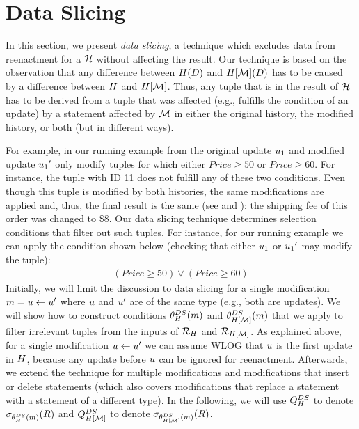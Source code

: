 \section{Data Slicing}
\label{sec:filter}

In this section, we present \textit{data slicing}, a technique which excludes data from reenactment for a \abbrHW $\mathcal{H}$ without affecting the result. Our technique is based on the observation that any difference between $H(D)$ and $H[\mathcal{M}](D)$ has to be caused  by a difference between $H$ and $H[\mathcal{M}]$. Thus, any tuple that is in the result of $\mathcal{H}$ has to be derived from a tuple that was affected (e.g., fulfills the condition of an update) by a statement affected by $\mathcal{M}$ in either the original history, the modified history, or both (but in different ways).

For example, in our running example from  the original update $u_1$ and modified update ${u_1}'$ only modify tuples for which either $Price \geq 50$ or $Price \geq 60$. For instance, the tuple with ID 11 does not fulfill any of these two conditions. Even though this tuple is modified by both histories, the same modifications are applied and, thus, the final result is the same (see  and ): the shipping fee of this order was changed to \$8. Our data slicing technique determines selection conditions that filter out such tuples. For instance, for our running example we can apply the condition shown below (checking that either $u_1$ or ${u_1}'$ may modify the tuple):
  \begin{align*}
    (Price \geq 50) \lor (Price \geq 60)
  \end{align*}
%
Initially, we will limit the discussion to data slicing for a single modification $m = u \gets u'$ where $u$ and $u'$ are of the same type (e.g., both are updates). We will show how to construct conditions $\theta_{H}^{DS}(m)$ and $\theta_{H[\mathcal{M}]}^{DS}(m)$ that we apply to filter irrelevant tuples from the inputs of $\mathcal{R}_{H}$ and $\mathcal{R}_{H[\mathcal{M}]}$. As explained above, for a single modification $u \gets u'$  we can assume WLOG that $u$ is the first update in $H$, because any update before $u$ can be ignored for reenactment. Afterwards, we extend the technique for multiple modifications and modifications that insert or delete statements (which also covers modifications that replace a statement with a statement of a different type). In the following, we will use $Q_{H}^{DS}$ to denote $\sigma_{\theta_{H}^{DS}(m)}(R)$ and $Q_{H[\mathcal{M}]}^{DS}$ to denote $\sigma_{\theta_{H[\mathcal{M}]}^{DS}(m)}(R)$.


